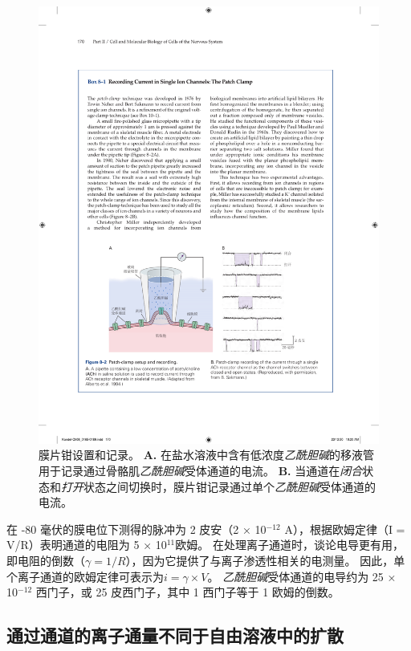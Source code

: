 \begin{figure}[htbp]
	\centering
	\includegraphics[width=0.9\linewidth]{chap08/fig_8_2}
	\caption{膜片钳设置和记录。
	\textbf{A.} 在盐水溶液中含有低浓度\textit{乙酰胆碱}的移液管用于记录通过骨骼肌\textit{乙酰胆碱}受体通道的电流\cite{alberts2017molecular}。
	\textbf{B.} 当通道在\textit{闭合}状态和\textit{打开}状态之间切换时，膜片钳记录通过单个\textit{乙酰胆碱}受体通道的电流。}
	\label{fig:8_2}
\end{figure}



在 -80 毫伏的膜电位下测得的脉冲为 2 皮安（2 × 10$^{-12}$ A），根据欧姆定律（I = V/R）表明通道的电阻为 5 × 10$^{11}$欧姆。
在处理离子通道时，谈论电导更有用，即电阻的倒数（$\gamma = 1/R$），因为它提供了与离子渗透性相关的电测量。
因此，单个离子通道的欧姆定律可表示为$i=\gamma \times V$。
\textit{乙酰胆碱}受体通道的电导约为 25 × 10$^{-12}$ 西门子，或 25 皮西门子，其中 1 西门子等于 1 欧姆的倒数。



\subsection{通过通道的离子通量不同于自由溶液中的扩散}


